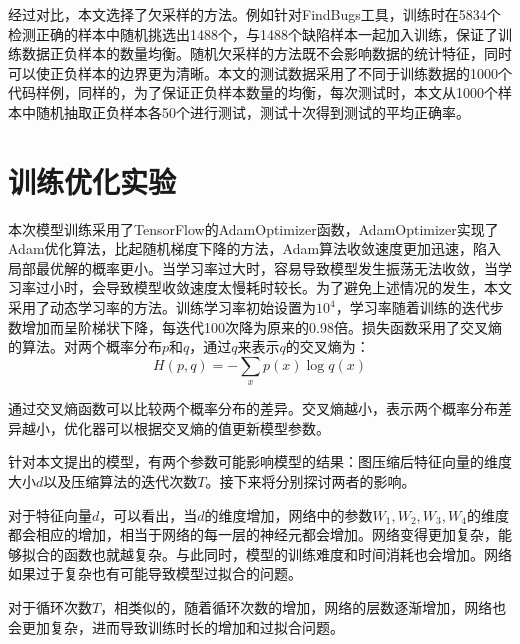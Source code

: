 经过对比，本文选择了欠采样的方法。例如针对FindBugs工具，训练时在5834个检测正确的样本中随机挑选出1488个，与1488个缺陷样本一起加入训练，保证了训练数据正负样本的数量均衡。随机欠采样的方法既不会影响数据的统计特征，同时可以使正负样本的边界更为清晰。本文的测试数据采用了不同于训练数据的1000个代码样例，同样的，为了保证正负样本数量的均衡，每次测试时，本文从1000个样本中随机抽取正负样本各50个进行测试，测试十次得到测试的平均正确率。

\section{训练优化实验}
本次模型训练采用了TensorFlow的AdamOptimizer函数，AdamOptimizer实现了Adam优化算法，比起随机梯度下降的方法，Adam算法收敛速度更加迅速，陷入局部最优解的概率更小。当学习率过大时，容易导致模型发生振荡无法收敛，当学习率过小时，会导致模型收敛速度太慢耗时较长。为了避免上述情况的发生，本文采用了动态学习率的方法。训练学习率初始设置为$10^{4}$，学习率随着训练的迭代步数增加而呈阶梯状下降，每迭代100次降为原来的0.98倍。损失函数采用了交叉熵的算法。对两个概率分布$p$和$q$，通过$q$来表示$q$的交叉熵为：
$$H(p,q) = -\sum_x p(x)\log q(x)$$

通过交叉熵函数可以比较两个概率分布的差异。交叉熵越小，表示两个概率分布差异越小，优化器可以根据交叉熵的值更新模型参数。

针对本文提出的模型，有两个参数可能影响模型的结果：图压缩后特征向量的维度大小$d$以及压缩算法的迭代次数$T$。接下来将分别探讨两者的影响。


对于特征向量$d$，可以看出，当$d$的维度增加，网络中的参数$W_1, W_2, W_3, W_4$的维度都会相应的增加，相当于网络的每一层的神经元都会增加。网络变得更加复杂，能够拟合的函数也就越复杂。与此同时，模型的训练难度和时间消耗也会增加。网络如果过于复杂也有可能导致模型过拟合的问题。

对于循环次数$T$，相类似的，随着循环次数的增加，网络的层数逐渐增加，网络也会更加复杂，进而导致训练时长的增加和过拟合问题。

